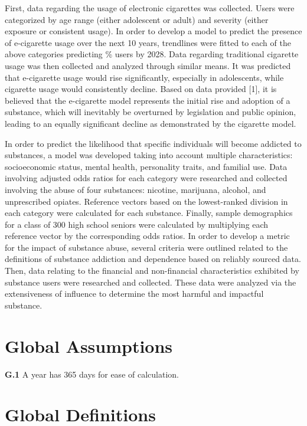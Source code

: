 First, data regarding the usage of electronic cigarettes was collected. Users were categorized by age range (either adolescent or adult) and severity (either exposure or consistent usage). In order to develop a model to predict the presence of e-cigarette usage over the next 10 years, trendlines were fitted to each of the above categories predicting \% users by 2028. Data regarding traditional cigarette usage was then collected and analyzed through similar means. It was predicted that e-cigarette usage would rise significantly, especially in adolescents, while cigarette usage would consistently decline. Based on data provided [1], it is believed that the e-cigarette model represents the initial rise and adoption of a substance, which will inevitably be overturned by legislation and public opinion, leading to an equally significant decline as demonstrated by the cigarette model.

In order to predict the likelihood that specific individuals will become addicted to substances, a model was developed taking into account multiple characteristics: socioeconomic status, mental health, personality traits, and familial use. Data involving adjusted odds ratios for each category were researched and collected involving the abuse of four substances: nicotine, marijuana, alcohol, and unprescribed opiates. Reference vectors based on the lowest-ranked division in each category were calculated for each substance. Finally, sample demographics for a class of 300 high school seniors were calculated by multiplying each reference vector by the corresponding odds ratios. 
In order to develop a metric for the impact of substance abuse, several criteria were outlined related to the definitions of substance addiction and dependence based on reliably sourced data. Then, data relating to the financial and non-financial characteristics exhibited by substance users were researched and collected. These data were analyzed via the extensiveness of influence to determine the most harmful and impactful substance.

\section*{Global Assumptions}
\textbf{G.1} A year has 365 days for ease of calculation.

\section*{Global Definitions}

